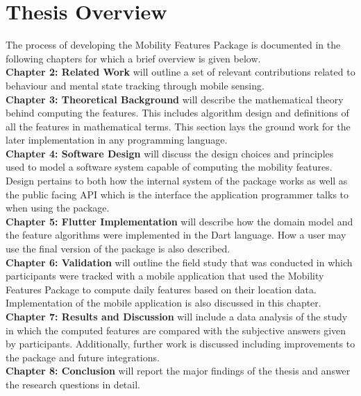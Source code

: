 \section{Thesis Overview}
The process of developing the Mobility Features Package is documented in the following chapters for which a brief overview is given below.\\

\textbf{Chapter 2: Related Work} will outline a set of relevant contributions related to behaviour and mental state tracking through mobile sensing. \\

\textbf{Chapter 3: Theoretical Background} will describe the mathematical theory behind computing the features. This includes algorithm design and definitions of all the features in mathematical terms. This section lays the ground work for the later implementation in any programming language.\\

\textbf{Chapter 4: Software Design} will discuss the design choices and principles used to model a software system capable of computing the mobility features. Design pertains to both how the internal system of the package works as well as the public facing API which is the interface the application programmer talks to when using the package.\\

\textbf{Chapter 5: Flutter Implementation} will describe how the domain model and the feature algorithms were implemented in the Dart language. How a user may use the final version of the package is also described.\\

\textbf{Chapter 6: Validation} will outline the field study that was conducted in which participants were tracked with a mobile application that used the Mobility Features Package to compute daily features based on their location data. Implementation of the mobile application is also discussed in this chapter.\\

\textbf{Chapter 7: Results and Discussion} will include a data analysis of the study in which the computed features are compared with the subjective answers given by participants. Additionally, further work is discussed including improvements to the package and future integrations.\\

\textbf{Chapter 8: Conclusion} will report the major findings of the thesis and answer the research questions in detail.\\